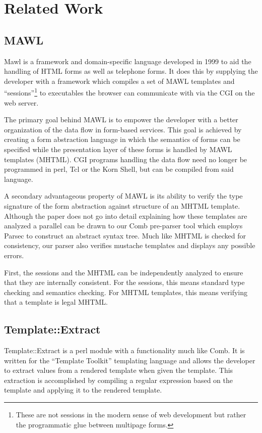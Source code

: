 \documentclass[thesis.tex]{subfiles}
\begin{document}
\chapter{Related Work}
\section{MAWL}
Mawl\cite{MAWL} is a framework and domain-specific language developed in 1999
to aid the handling of HTML forms as well as telephone forms.
It does this by supplying the developer with a framework which compiles
a set of MAWL templates and ``sessions''\footnote{
	These are not sessions in the modern sense of web development but rather
	the programmatic glue between multipage forms.
} to executables
the browser can communicate with via the CGI on the web server.

The primary goal behind MAWL is to empower the developer with a better
organization of the data flow in form-based services.
This goal is achieved by creating a form abstraction language in which the
semantics of forms can be specified while the presentation layer of these forms
is handled by MAWL templates (MHTML).
CGI programs handling the data flow need no longer be programmed in
perl, Tcl or the Korn Shell, but can be compiled from said language.

A secondary advantageous property of MAWL is its ability to verify the
type signature of the form abstraction against structure of an MHTML template.
Although the paper does not go into detail explaining how these templates are
analyzed a parallel can be drawn to our Comb pre-parser tool which employs
Parsec to construct an abstract syntax tree. Much like MHTML is checked for
consistency, our parser also verifies mustache templates and displays any
possible errors.
\begin{citequote}{\cite{MAWL}}
First, the sessions and the MHTML can be independently analyzed to ensure that
they are internally consistent.
For the sessions, this means standard type checking and semantics checking.
For MHTML templates, this means verifying that a template is legal MHTML.
\end{citequote}


\section{Template::Extract}
Template::Extract\cite{TPLEXTRACT} is a perl module with a functionality much
like Comb. It is written for the ``Template Toolkit'' templating language and
allows the developer to extract values from a rendered template when given the
template. This extraction is accomplished by compiling a regular expression
based on the template and applying it to the rendered template.
\end{document}
